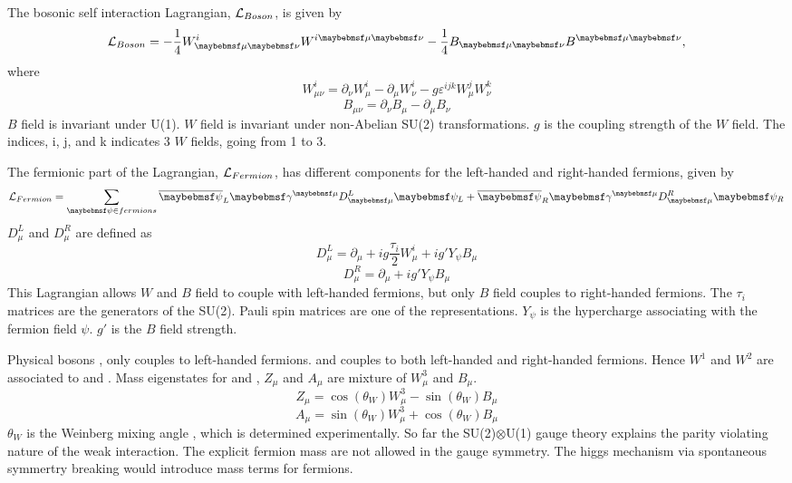 The bosonic self interaction Lagrangian, $\operatorname{\mathcal{L}}_{Boson}$, is given by
\begin{equation}
\Lagr_{Boson} = - \frac{1}{4} W^i_{\mu\nu} W^{i\mu\nu} - \frac{1}{4}B_{\mu\nu} B^{\mu\nu},
\end{equation}
where
\begin{equation}
W^i_{\mu\nu} = \partial_{\nu}W^i_{\mu} - \partial_{\mu}W^i_{\nu} - g\varepsilon^{ijk}W^j_{\mu}W^k_\nu
\end{equation}
\begin{equation}
B_{\mu\nu} = \partial_{\nu}B_{\mu} - \partial_{\mu}B_{\nu}
\end{equation}
$B$ field  is invariant under U(1). $W$ field is invariant under non-Abelian SU(2) transformations. $g$ is the coupling strength of the $W$ field. The indices, i, j, and k indicates 3 $W$ fields, going from 1 to 3.

The fermionic part of the Lagrangian,   $\operatorname{\mathcal{L}}_{Fermion}$, has different components for the left-handed and right-handed fermions, given by
\begin{equation}
\Lagr_{Fermion} = \sum_{\psi\in{fermions}} {\overline{\psi}}_L \gamma^{\mu}D^L_{\mu} \psi_L +  \overline{\psi}_R \gamma^{\mu}D^R_{\mu} \psi_R
\end{equation}
$D^L_{\mu}$ and $D^R_{\mu}$ are defined as
\begin{equation}
D^L_{\mu} = \partial_{\mu} + ig\frac{\tau_i}{2}W^i_{\mu} + ig'Y_{\psi}B_{\mu}
\end{equation}
\begin{equation}
D^R_{\mu} = \partial_{\mu}  + ig'Y_{\psi}B_{\mu}
\end{equation}
This Lagrangian allows $W$ and $B$ field to couple with left-handed fermions, but only $B$ field couples to right-handed fermions. The $\tau_i$ matrices are the generators of the SU(2). Pauli spin matrices are one of the representations. $Y_{\psi}$ is the hypercharge associating with the fermion field $\psi$. $g'$ is the $B$ field strength.

Physical bosons \PWp, \PWm  only couples to left-handed fermions. \PZ and \Pgamma couples to both left-handed and right-handed fermions. Hence $W^1$ and $W^2$ are associated to \PWp and \PWm. Mass eigenstates for \PZ and \Pgamma, $Z_{\mu}$ and $A_{\mu}$ are mixture of $W^3_{\mu}$ and $B_{\mu}$.
\begin{equation}
Z_{\mu} = \cos\left(\theta_W\right)W^3_{\mu} - \sin\left(\theta_W\right)B_{\mu}
\end{equation}
\begin{equation}
A_{\mu} = \sin\left(\theta_W\right)W^3_{\mu} + \cos\left(\theta_W\right)B_{\mu}
\end{equation}
$\theta_W$ is the Weinberg mixing angle \cite{Weinberg:1967tq}, which is determined experimentally. So far the SU(2)$\otimes$U(1) gauge theory explains the parity violating nature of the weak interaction. The explicit fermion mass are not allowed in the gauge symmetry. The higgs mechanism via spontaneous symmertry breaking would introduce mass terms for fermions.

